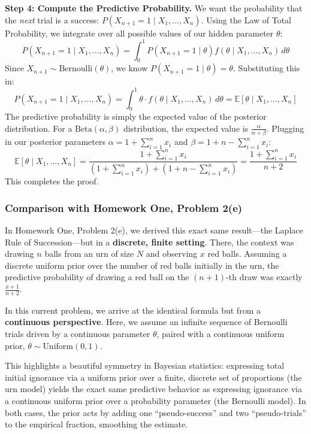 \documentclass[
  letterpaper,
  DIV=11,
  numbers=noendperiod]{scrartcl}
\begin{document}
\textbf{Step 4: Compute the Predictive Probability.} We want the
probability that the \emph{next} trial is a success:
\(P(X_{n+1} = 1 \mid X_1, \dots, X_n)\). Using the Law of Total
Probability, we integrate over all possible values of our hidden
parameter \(\theta\): \[
P(X_{n+1} = 1 \mid X_1, \dots, X_n) = \int_0^1 P(X_{n+1} = 1 \mid \theta) f(\theta \mid X_1, \dots, X_n) \, d\theta
\] Since \(X_{n+1} \sim \text{Bernoulli}(\theta)\), we know
\(P(X_{n+1} = 1 \mid \theta) = \theta\). Substituting this in: \[
P(X_{n+1} = 1 \mid X_1, \dots, X_n) = \int_0^1 \theta \cdot f(\theta \mid X_1, \dots, X_n) \, d\theta = \mathbb{E}[\theta \mid X_1, \dots, X_n]
\] The predictive probability is simply the expected value of the
posterior distribution. For a \(\text{Beta}(\alpha, \beta)\)
distribution, the expected value is \(\frac{\alpha}{\alpha + \beta}\).
Plugging in our posterior parameters \(\alpha = 1 + \sum_{i=1}^n x_i\)
and \(\beta = 1 + n - \sum_{i=1}^n x_i\): \[
\mathbb{E}[\theta \mid X_1, \dots, X_n] = \frac{1 + \sum_{i=1}^n x_i}{(1 + \sum_{i=1}^n x_i) + (1 + n - \sum_{i=1}^n x_i)} = \frac{1 + \sum_{i=1}^n x_i}{n + 2}
\] This completes the proof.

\subsubsection{Comparison with Homework One, Problem
2(e)}\label{comparison-with-homework-one-problem-2e}

In Homework One, Problem 2(e), we derived this exact same result---the
Laplace Rule of Succession---but in a \textbf{discrete, finite setting}.
There, the context was drawing \(n\) balls from an urn of size \(N\) and
observing \(x\) red balls. Assuming a discrete uniform prior over the
number of red balls initially in the urn, the predictive probability of
drawing a red ball on the \((n+1)\)-th draw was exactly
\(\frac{x+1}{n+2}\).

In this current problem, we arrive at the identical formula but from a
\textbf{continuous perspective}. Here, we assume an infinite sequence of
Bernoulli trials driven by a continuous parameter \(\theta\), paired
with a continuous uniform prior, \(\theta \sim \text{Uniform}(0, 1)\).

This highlights a beautiful symmetry in Bayesian statistics: expressing
total initial ignorance via a uniform prior over a finite, discrete set
of proportions (the urn model) yields the exact same predictive behavior
as expressing ignorance via a continuous uniform prior over a
probability parameter (the Bernoulli model). In both cases, the prior
acts by adding one ``pseudo-success'' and two ``pseudo-trials'' to the
empirical fraction, smoothing the estimate.
\end{document}
